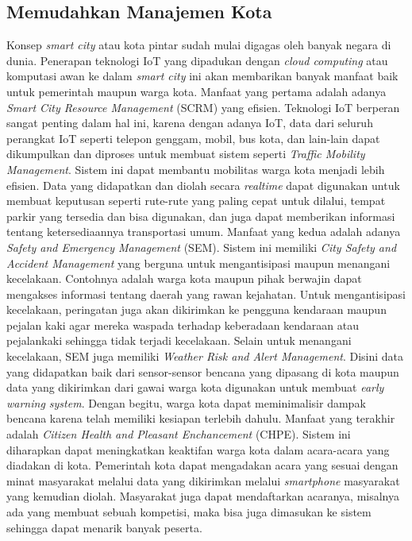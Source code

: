 \documentclass[12pt, letterpaper]{article}
\begin{document}
\subsection{Memudahkan Manajemen Kota}
Konsep \textit{smart city} atau kota pintar sudah mulai digagas oleh banyak negara di dunia. Penerapan teknologi IoT yang dipadukan dengan \textit{cloud computing} atau komputasi awan ke dalam \textit{smart city} ini akan membarikan banyak manfaat baik untuk pemerintah maupun warga kota. \cite{icfit15}
\newline
\indent
Manfaat yang pertama adalah adanya \textit{Smart City Resource Management} (SCRM) yang efisien. Teknologi IoT berperan sangat penting dalam hal ini, karena dengan adanya IoT, data dari seluruh perangkat IoT seperti telepon genggam, mobil, bus kota, dan lain-lain dapat dikumpulkan dan diproses untuk membuat sistem seperti \textit{Traffic Mobility Management}. Sistem ini dapat membantu mobilitas warga kota menjadi lebih efisien. Data yang didapatkan dan diolah secara \textit{realtime}
dapat digunakan untuk membuat keputusan seperti rute-rute yang paling cepat untuk dilalui, tempat parkir yang tersedia dan bisa digunakan, dan juga dapat memberikan informasi tentang ketersediaannya transportasi umum.
\newline
\indent
Manfaat yang kedua adalah adanya \textit{Safety and Emergency Management} (SEM). Sistem ini memiliki \textit{City Safety and Accident Management} yang berguna untuk mengantisipasi maupun menangani kecelakaan. Contohnya adalah warga kota maupun pihak berwajin dapat mengakses informasi tentang daerah yang rawan kejahatan. Untuk mengantisipasi kecelakaan, peringatan juga akan dikirimkan ke pengguna kendaraan maupun pejalan kaki agar mereka waspada terhadap keberadaan kendaraan atau
pejalankaki sehingga tidak terjadi kecelakaan.
\newline
\indent
Selain untuk menangani kecelakaan, SEM juga memiliki \textit{Weather Risk and Alert Management}. Disini data yang didapatkan baik dari sensor-sensor bencana yang dipasang di kota maupun data yang dikirimkan dari gawai warga kota digunakan untuk membuat \textit{early warning system}. Dengan begitu, warga kota dapat meminimalisir dampak bencana karena telah memiliki kesiapan terlebih dahulu.
\newline
\indent
Manfaat yang terakhir adalah \textit{Citizen Health and Pleasant Enchancement} (CHPE). Sistem ini diharapkan dapat meningkatkan keaktifan warga kota dalam acara-acara yang diadakan di kota. Pemerintah kota dapat mengadakan acara yang sesuai dengan minat masyarakat melalui data yang dikirimkan melalui \textit{smartphone} masyarakat yang kemudian diolah. Masyarakat juga dapat mendaftarkan acaranya, misalnya ada yang membuat sebuah kompetisi, maka bisa juga dimasukan ke sistem sehingga
dapat menarik banyak peserta.
\newline
\end{document}
